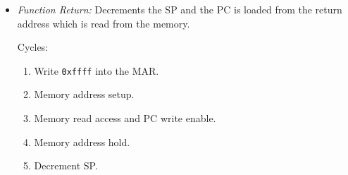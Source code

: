 \begin{itemize}
  \item \emph{Function Return:} Decrements the \gls{SP} and the \gls{PC} is loaded from the return address which is read from the memory.

  Cycles:
  \begin{enumerate}
    \item Write \texttt{0xffff} into the \gls{MAR}.
    \item Memory address setup.
    \item Memory read access and \gls{PC} write enable.
    \item Memory address hold.
    \item Decrement \gls{SP}.
  \end{enumerate}
\end{itemize}